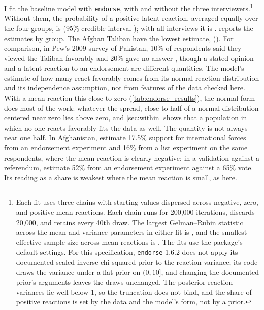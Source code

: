 \documentclass[11pt,letterpaper]{article}
\begin{document}
I fit the baseline model with \texttt{endorse}, with and without the three interviewers.\footnote{Each fit uses three chains with starting values dispersed across negative, zero, and positive mean reactions. Each chain runs for 200,000 iterations, discards 20,000, and retains every 40th draw. The largest Gelman--Rubin statistic across the mean and variance parameters in either fit is \MaxRhat{}, and the smallest effective sample size across mean reactions is \MinESS{}. The fits use the package's default settings. For this specification, \texttt{endorse} 1.6.2 does not apply its documented scaled inverse-chi-squared prior to the reaction variance; its code draws the variance under a flat prior on $(0, 10]$, and changing the documented prior's arguments leaves the draws unchanged. The posterior reaction variances lie well below 1, so the truncation does not bind, and the share of positive reactions is set by the data and the model's form, not by a prior.}
Without them, the probability of a positive latent reaction, averaged equally over the four groups, is \PrimaryShare{} (95\% credible interval \PrimaryInterval{}); with all interviews it is \FullPrimaryShare{}.  reports the estimates by group. The Afghan Taliban have the lowest estimate, \AfghanShare{} (\AfghanInterval{}). For comparison, in Pew's 2009 survey of Pakistan, 10\% of respondents said they viewed the Taliban favorably and 20\% gave no answer \citep{pew2009data}, though a stated opinion and a latent reaction to an endorsement are different quantities. The model's estimate of how many react favorably comes from its normal reaction distribution and its independence assumption, not from features of the data checked here. With a mean reaction this close to zero (\cref{tab:endorse_results}), the normal form does most of the work: whatever the spread, close to half of a normal distribution centered near zero lies above zero, and \cref{sec:within} shows that a population in which no one reacts favorably fits the data as well. The quantity is not always near one half. In Afghanistan, \citet{blair2014comparing} estimate 17.5\% support for international forces from an endorsement experiment and 16\% from a list experiment on the same respondents, where the mean reaction is clearly negative; in a validation against a referendum, \citet{rosenfeld2016validation} estimate 52\% from an endorsement experiment against a 65\% vote. Its reading as a share is weakest where the mean reaction is small, as here.
\end{document}

